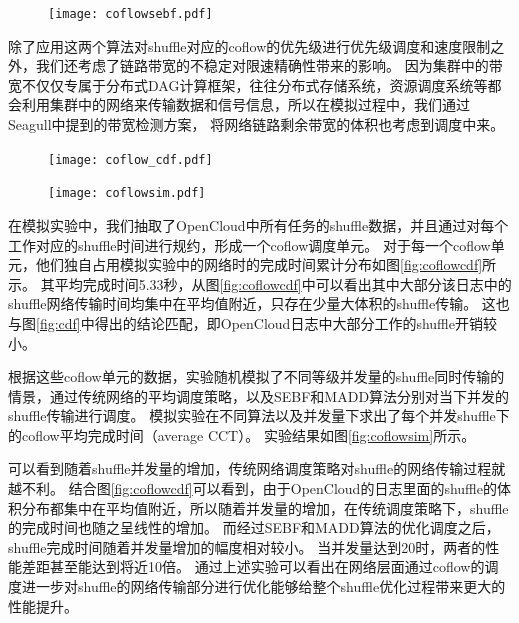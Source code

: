 \begin{figure}[!htp]
	\centering
	\texttt{[image: coflowsebf.pdf]}
\end{figure}

除了应用这两个算法对shuffle对应的coflow的优先级进行优先级调度和速度限制之外，我们还考虑了链路带宽的不稳定对限速精确性带来的影响。
因为集群中的带宽不仅仅专属于分布式DAG计算框架，往往分布式存储系统，资源调度系统等都会利用集群中的网络来传输数据和信号信息，所以在模拟过程中，我们通过Seagull\cite{seagull}中提到的带宽检测方案，
将网络链路剩余带宽的体积也考虑到调度中来。

\begin{figure}[!htp]
	\centering
	\texttt{[image: coflow\_cdf.pdf]}
\end{figure}

\begin{figure}[!htp]
	\centering
	\texttt{[image: coflowsim.pdf]}
\end{figure}

在模拟实验中，我们抽取了OpenCloud中所有任务的shuffle数据，并且通过对每个工作对应的shuffle时间进行规约，形成一个coflow调度单元。
对于每一个coflow单元，他们独自占用模拟实验中的网络时的完成时间累计分布如图\ref{fig:coflowcdf}所示。
其平均完成时间5.33秒，从图\ref{fig:coflowcdf}中可以看出其中大部分该日志中的shuffle网络传输时间均集中在平均值附近，只存在少量大体积的shuffle传输。
这也与图\ref{fig:cdf}中得出的结论匹配，即OpenCloud日志中大部分工作的shuffle开销较小。

根据这些coflow单元的数据，实验随机模拟了不同等级并发量的shuffle同时传输的情景，通过传统网络的平均调度策略，以及SEBF和MADD算法分别对当下并发的shuffle传输进行调度。
模拟实验在不同算法以及并发量下求出了每个并发shuffle下的coflow平均完成时间（average CCT）。
实验结果如图\ref{fig:coflowsim}所示。

可以看到随着shuffle并发量的增加，传统网络调度策略对shuffle的网络传输过程就越不利。
结合图\ref{fig:coflowcdf}可以看到，由于OpenCloud的日志里面的shuffle的体积分布都集中在平均值附近，所以随着并发量的增加，在传统调度策略下，shuffle的完成时间也随之呈线性的增加。
而经过SEBF和MADD算法的优化调度之后，shuffle完成时间随着并发量增加的幅度相对较小。
当并发量达到20时，两者的性能差距甚至能达到将近10倍。
通过上述实验可以看出在网络层面通过coflow的调度进一步对shuffle的网络传输部分进行优化能够给整个shuffle优化过程带来更大的性能提升。
